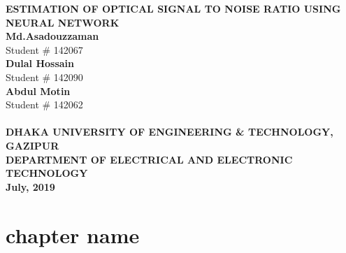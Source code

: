\documentclass[12pt]{report}
\begin{document}
	\begin{titlepage}
		\begin{center}
			{\huge \bfseries {ESTIMATION OF OPTICAL SIGNAL TO NOISE RATIO USING NEURAL NETWORK}}\\[1cm]
			\textbf{Md.Asadouzzaman}\\
			Student \# 142067\\
			\textbf{Dulal Hossain}\\
			Student \# 142090\\
			\textbf{Abdul Motin}\\
			Student \# 142062\\
			[1cm]
			\\[2cm]
			\Large \bfseries {DHAKA UNIVERSITY OF ENGINEERING \& TECHNOLOGY, GAZIPUR}\\
			\large \bfseries {DEPARTMENT OF ELECTRICAL AND ELECTRONIC TECHNOLOGY}\\
			\textbf{July, 2019}\\
		\end{center}
	\end{titlepage}

\tableofcontents
\listoffigures

\chapter{chapter name}
\end{document}

